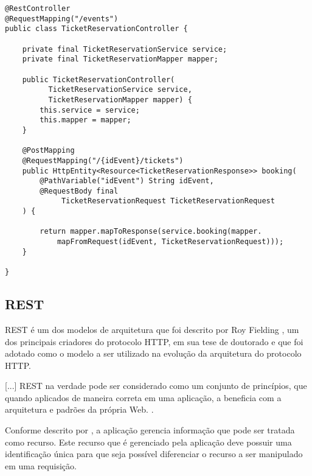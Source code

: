 \begin{lstlisting}[label=classe-ticket-reservation-reservation-controller,caption=Classe TicketReservationController em Java]
@RestController
@RequestMapping("/events")
public class TicketReservationController {

    private final TicketReservationService service;
    private final TicketReservationMapper mapper;

    public TicketReservationController(
          TicketReservationService service,
          TicketReservationMapper mapper) {
        this.service = service;
        this.mapper = mapper;
    }

    @PostMapping
    @RequestMapping("/{idEvent}/tickets")
    public HttpEntity<Resource<TicketReservationResponse>> booking(
        @PathVariable("idEvent") String idEvent,
        @RequestBody final
             TicketReservationRequest TicketReservationRequest
    ) {

        return mapper.mapToResponse(service.booking(mapper.
            mapFromRequest(idEvent, TicketReservationRequest)));
    }

}
\end{lstlisting}

\subsection{REST}\label{rest}

\begin{citacao}

REST é um dos modelos de arquitetura que foi descrito por
Roy Fielding \cite[5]{rest-roy-thomas-fielding},
um dos principais criadores do protocolo HTTP, em sua tese de doutorado
e que foi adotado como o modelo a ser utilizado na evolução da arquitetura
do protocolo HTTP.

[...] REST na verdade pode ser considerado como um conjunto de princípios,
que quando aplicados de maneira correta em uma aplicação, a beneficia com a
arquitetura e padrões da própria Web. \cite{rest-principios-e-boas-praticas}.

\end{citacao}

Conforme descrito por \cite{rest-principios-e-boas-praticas}, a aplicação
gerencia informação que pode ser tratada como recurso. Este recurso que é
gerenciado pela aplicação deve possuir uma identificação única para que seja
possível diferenciar o recurso a ser manipulado em uma requisição.


